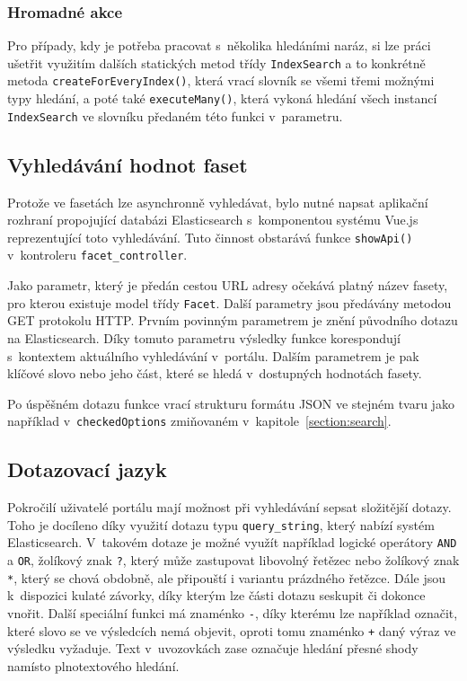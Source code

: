 \subsubsection*{Hromadné akce}
Pro případy, kdy je potřeba pracovat s~několika hledáními naráz, si lze práci ušetřit využitím dalších statických metod třídy \texttt{IndexSearch} a to konkrétně metoda \texttt{createForEveryIndex()}, která vrací slovník se všemi třemi možnými typy hledání, a poté také \texttt{executeMany()}, která vykoná hledání všech instancí \texttt{IndexSearch} ve slovníku předaném této funkci v~parametru. 

\subsection{Vyhledávání hodnot faset}
Protože ve fasetách lze asynchronně vyhledávat, bylo nutné napsat aplikační rozhraní propojující databázi Elasticsearch s~komponentou systému Vue.js reprezentující toto vyhledávání. Tuto činnost obstarává funkce \texttt{showApi()} v~kontroleru \texttt{facet\_controller}.

Jako parametr, který je předán cestou URL adresy očekává platný název fasety, pro kterou existuje model třídy \texttt{Facet}. Další parametry jsou předávány metodou GET protokolu HTTP. Prvním povinným parametrem je znění původního dotazu na Elasticsearch. Díky tomuto parametru výsledky funkce korespondují s~kontextem aktuálního vyhledávání v~portálu. Dalším parametrem je pak klíčové slovo nebo jeho část, které se hledá v~dostupných hodnotách fasety. 

Po úspěšném dotazu funkce vrací strukturu formátu JSON ve stejném tvaru jako například v~\texttt{checkedOptions} zmiňovaném v~kapitole~\ref{section:search}.

\subsection{Dotazovací jazyk}
Pokročilí uživatelé portálu mají možnost při vyhledávání sepsat složitější dotazy. Toho je docíleno díky využití dotazu typu \texttt{query\_string}, který nabízí systém Elasticsearch. V~takovém dotaze je možné využít například logické operátory \texttt{AND} a \texttt{OR}, žolíkový znak \texttt{?}, který může zastupovat libovolný řetězec nebo žolíkový znak \texttt{*}, který se chová obdobně, ale připouští i variantu prázdného řetězce. Dále jsou k~dispozici kulaté závorky, díky kterým lze části dotazu seskupit či dokonce vnořit. Další speciální funkci má znaménko \texttt{-}, díky kterému lze například označit, které slovo se ve výsledcích nemá objevit, oproti tomu znaménko \texttt{+} daný výraz ve výsledku vyžaduje. Text v~uvozovkách zase označuje hledání přesné shody namísto plnotextového hledání.

